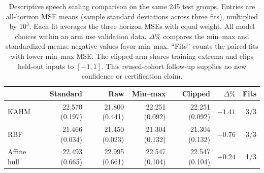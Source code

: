 \begin{table}[t]
\centering
\small
\setlength{\tabcolsep}{3.5pt}
\begin{tabular}{lrrrrrr}
\toprule
& Standard & Raw & Min--max & Clipped & $\Delta\%$ & Fits \\
\midrule
KAHM & 22.570 (0.197) & 21.800 (0.441) & 22.251 (0.092) & 22.251 (0.092) & $-1.41$ & 3/3 \\
RBF & 21.466 (0.034) & 21.450 (0.023) & 21.304 (0.132) & 21.304 (0.132) & $-0.76$ & 3/3 \\
Affine hull & 22.493 (0.665) & 22.995 (0.661) & 22.547 (0.104) & 22.547 (0.104) & $+0.24$ & 1/3 \\
\bottomrule
\end{tabular}
\caption{Descriptive speech scaling comparison on the same 245 test groups.
Entries are all-horizon MSE means (sample standard deviations across three fits),
multiplied by $10^3$. Each fit averages the three horizon MSEs with equal weight.
All model choices within an arm use validation data. $\Delta\%$ compares the
min--max and standardized means; negative values favor min--max. ``Fits'' counts
the paired fits with lower min--max MSE. The clipped arm shares training extrema
and clips held-out inputs to $[-1,1]$. This reused-cohort follow-up supplies no
new confidence or certification claim.}
\label{tab:speech-scaling}
\end{table}
